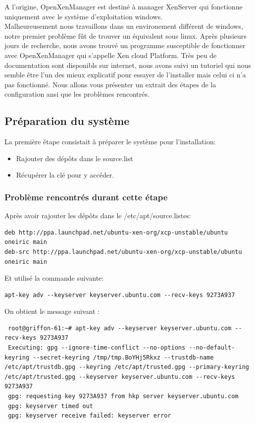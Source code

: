 A l'origine, OpenXenManager est destiné à manager XenServer qui fonctionne uniquement avec le système d'exploitation windows.\\Malheureusement nous travaillons dans un environement différent de windows, notre premier problème fût de trouver un équivalent sous linux.
Après plusieurs jours de recherche, nous avons trouvé un programme susceptible de fonctionner avec OpenXenManager qui s'appelle Xen cloud Platform.
Très peu de documentation sont disponibls sur internet, nous avons suivi un tutoriel qui nous semble être l'un des mieux explicatif pour essayer de l'installer mais celui ci n'a pas fonctionné.
Nous allons vous présenter un extrait des étapes de la configuration ansi que les problèmes rencontrés.
\subsection{Préparation du système}
La première étape consistait à préparer le système pour l'installation:
\begin{itemize}
\item Rajouter des dépôts dans le source.list
\item Récupérer la clé pour y accéder.
\end{itemize}

\subsubsection{Problème rencontrés durant cette étape}

Après avoir rajouter les dépôts dans le /etc/apt/source.listes:

\begin{lstlisting}
deb http://ppa.launchpad.net/ubuntu-xen-org/xcp-unstable/ubuntu oneiric main 
deb-src http://ppa.launchpad.net/ubuntu-xen-org/xcp-unstable/ubuntu oneiric main
\end{lstlisting}
Et utilisé la commande suivante:
\begin{lstlisting}
apt-key adv --keyserver keyserver.ubuntu.com --recv-keys 9273A937
\end{lstlisting}

On obtient le message suivant :

\begin{lstlisting}
 root@griffon-61:~# apt-key adv --keyserver keyserver.ubuntu.com --recv-keys 9273A937
 Executing: gpg --ignore-time-conflict --no-options --no-default-keyring --secret-keyring /tmp/tmp.BoYHj5Rkxz --trustdb-name /etc/apt/trustdb.gpg --keyring /etc/apt/trusted.gpg --primary-keyring /etc/apt/trusted.gpg --keyserver keyserver.ubuntu.com --recv-keys 9273A937
 gpg: requesting key 9273A937 from hkp server keyserver.ubuntu.com
 gpg: keyserver timed out
 gpg: keyserver receive failed: keyserver error
\end{lstlisting}

